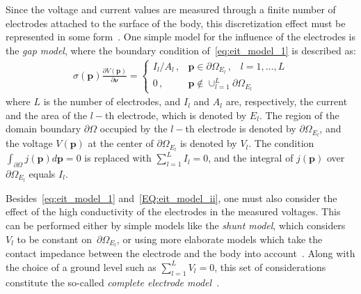 \documentclass[10pt]{IEEEtran}
\newcommand{\vp}{\mathbf{\textstyle{p}}}
\begin{document}
Since the voltage and current values are measured through a finite number of electrodes attached to the surface of the body, this discretization effect must be represented in some form~\cite{Cheng1989electrode}. One simple model for the influence of the electrodes is the \textit{gap model}, where the boundary condition of~\eqref{eq:eit_model_1} is described as:
%
\begin{align} \label{EQ:eit_model_ii}
    \sigma(\vp) \frac{\partial V(\vp)}{\partial\boldsymbol{\nu}} =
    \left\{\begin{array}{cl}
        I_l/A_l\,,  &  \vp\in\partial\Omega_{E_l}
        \,\text{,}\quad 
        {l=1,\ldots,L}\\
        0\,, & \vp\notin \cup_{l=1}^L \partial\Omega_{E_l}
    \end{array}\right.
\end{align}
where $L$ is the number of electrodes, and $I_l$ and $A_l$ are, respectively, the current and the area of the $l-$th electrode, which is denoted by $E_l$. The region of the domain boundary $\partial\Omega$ occupied by the $l-$th electrode is denoted by $\partial\Omega_{E_l}$, and the voltage $V(\vp)$ at the center of $\partial\Omega_{E_l}$ is denoted by $V_l$.
%
The condition~$\int_{\partial\Omega}j(\vp)d\vp=0$ is replaced with $\sum_{l=1}^LI_l=0$, and the integral of $j(\vp)$ over $\partial\Omega_{E_l}$ equals $I_l$.




Besides~\eqref{eq:eit_model_1} and~\eqref{EQ:eit_model_ii}, one must also consider the effect of the high conductivity of the electrodes in the measured voltages.
%
This can be performed either by simple models like the \textit{shunt model}, which considers $V_l$ to be constant on~$\partial\Omega_{E_l}$, or using more elaborate models which take the contact impedance between the electrode and the body into account~\cite{cheney1999eitreview}.
%
Along with the choice of a ground level such as $\sum_{l=1}^LV_l=0$, this set of considerations constitute the so-called \textit{complete electrode model}~\cite{cheney1999eitreview}.
\end{document}
